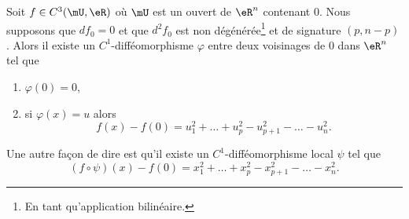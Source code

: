 \begin{lemma}     \label{LemNQAmCLo}
    Soit \( f\in C^3(\mU,\eR)\) où \( \mU\) est un ouvert de \( \eR^n\) contenant \( 0\). Nous supposons que \( df_0=0\) et que \( d^2f_0\) est non dégénérée\footnote{En tant qu'application bilinéaire.} et de signature \( (p,n-p)\). Alors il existe un \( C^1\)-difféomorphisme \( \varphi\) entre deux voisinages de \( 0\) dans \( \eR^n\) tel que
    \begin{enumerate}
        \item
            \( \varphi(0)=0\),
        \item
            si \( \varphi(x)=u\) alors
            \begin{equation}
                f(x)-f(0)=u_1^2+\ldots +u_p^2-u_{p+1}^2-\ldots-u_n^2.
            \end{equation}
    \end{enumerate}
    Une autre façon de dire est qu'il existe un \( C^1\)-difféomorphisme local \( \psi\) tel que
    \begin{equation}
        (f\circ\psi)(x)-f(0)=x_1^2+\ldots +x_p^2-x_{p+1}^2-\ldots-x_n^2.
    \end{equation}
\end{lemma}

